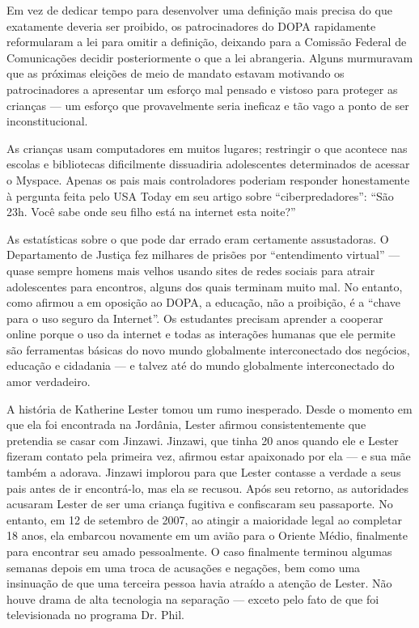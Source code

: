\begin{tcolorbox}
    Em vez de dedicar tempo para desenvolver uma definição mais precisa do que exatamente deveria
    ser proibido, os patrocinadores do DOPA rapidamente reformularam a lei para omitir a
    definição, deixando para a Comissão Federal de Comunicações decidir posteriormente o que a
    lei abrangeria. Alguns murmuravam que as próximas eleições de meio de mandato estavam
    motivando os patrocinadores a apresentar um esforço mal pensado e vistoso para proteger as
    crianças --- um esforço que provavelmente seria ineficaz e tão vago a ponto de ser
    inconstitucional.
    
    As crianças usam computadores em muitos lugares; restringir o que acontece nas escolas e
    bibliotecas dificilmente dissuadiria adolescentes determinados de acessar o Myspace. Apenas
    os pais mais controladores poderiam responder honestamente à pergunta feita pelo USA Today
    em seu artigo sobre ``ciberpredadores'': ``São 23h. Você sabe onde seu filho está na internet
    esta noite?''
    
    As estatísticas sobre o que pode dar errado eram certamente assustadoras. O Departamento de
    Justiça fez milhares de prisões por ``entendimento virtual'' --- quase sempre homens mais
    velhos usando sites de redes sociais para atrair adolescentes para encontros, alguns dos
    quais terminam muito mal. No entanto, como afirmou a 
    em oposição ao DOPA, a educação, não a proibição, é a ``chave para o uso seguro da
    Internet''. Os estudantes precisam aprender a cooperar online porque o uso da internet e
    todas as interações humanas que ele permite são ferramentas básicas do novo mundo
    globalmente interconectado dos negócios, educação e cidadania --- e talvez até do mundo
    globalmente interconectado do amor verdadeiro.
    
    A história de Katherine Lester tomou um rumo inesperado. Desde o momento em que ela foi
    encontrada na Jordânia, Lester afirmou consistentemente que pretendia se casar com Jinzawi.
    Jinzawi, que tinha 20 anos quando ele e Lester fizeram contato pela primeira vez, afirmou
    estar apaixonado por ela --- e sua mãe também a adorava. Jinzawi implorou para que Lester
    contasse a verdade a seus pais antes de ir encontrá-lo, mas ela se recusou. Após seu retorno,
    as autoridades acusaram Lester de ser uma criança fugitiva e confiscaram seu passaporte. No
    entanto, em 12 de setembro de 2007, ao atingir a maioridade legal ao completar 18 anos, ela
    embarcou novamente em um avião para o Oriente Médio, finalmente para encontrar seu amado
    pessoalmente. O caso finalmente terminou algumas semanas depois em uma troca de acusações e
    negações, bem como uma insinuação de que uma terceira pessoa havia atraído a atenção de
    Lester. Não houve drama de alta tecnologia na separação --- exceto pelo fato de que foi
    televisionada no programa Dr. Phil.
\end{tcolorbox}

